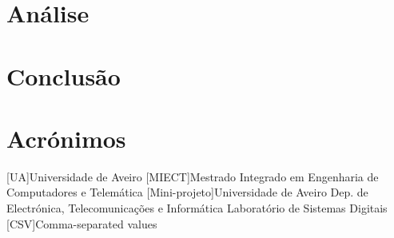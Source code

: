 \documentclass{report}
\begin{document}
\chapter{Análise}
\label{chap:analise}
\chapter{Conclusão}
\label{chap:conclusao}
\chapter*{Acrónimos}
\begin{acronym}
[UA]{Universidade de Aveiro}
[MIECT]{Mestrado Integrado em Engenharia de Computadores e Telemática}
[Mini-projeto]{Universidade de Aveiro
		Dep. de Electrónica, Telecomunicações e Informática
		Laboratório de Sistemas Digitais}
[CSV]{Comma-separated values}
\end{acronym}



\end{document}
